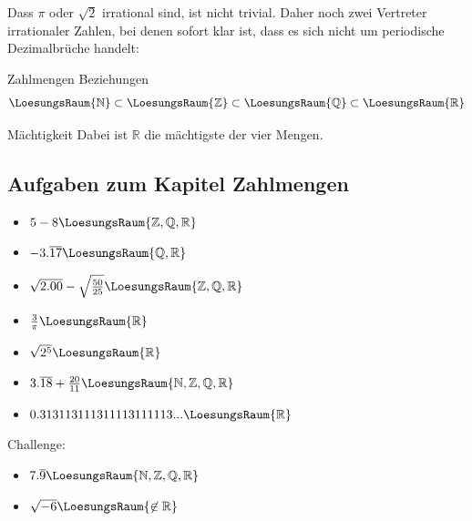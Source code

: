 Dass $\pi$ oder $\sqrt{2}$ irrational sind, ist nicht trivial. Daher
noch zwei Vertreter irrationaler Zahlen, bei denen sofort klar ist,
dass es sich nicht um periodische Dezimalbrüche handelt:


\begin{gesetz}{Zahlmengen Beziehungen}{}
$$\LoesungsRaum{\mathbb{N}} \subset \LoesungsRaum{\mathbb{Z}} \subset
  \LoesungsRaum{\mathbb{Q}} \subset \LoesungsRaum{\mathbb{R}} $$%
\end{gesetz}


\begin{bemerkung}{Mächtigkeit}{}
  Dabei ist $\mathbb{R}$ die mächtigste der vier Mengen. 
\end{bemerkung}



\subsection*{Aufgaben zum Kapitel Zahlmengen}


\begin{itemize}
\item $5-8 \LoesungsRaum{\mathbb{Z,Q,R}}$
\item $-3.\overline{17} \LoesungsRaum{\mathbb{Q,R}}$
\item $\sqrt{2.00} - \sqrt{\frac{50}{25}} \LoesungsRaum{\mathbb{Z,Q,R}}$
\item $\frac{3}{\pi} \LoesungsRaum{\mathbb{R}}$
\item $\sqrt{2^5}\LoesungsRaum{\mathbb{R}}$
\item $3.\overline{18}+\frac{20}{11} \LoesungsRaum{\mathbb{N,Z,Q,R}}$
\item $0.313113111311113111113... \LoesungsRaum{\mathbb{R}}$
\end{itemize}
Challenge:
\begin{itemize}
\item $7.\overline{9} \LoesungsRaum{\mathbb{N,Z,Q,R}}$
\item $\sqrt{-6} \LoesungsRaum{\not\in\mathbb{R}}$
\end{itemize} 


